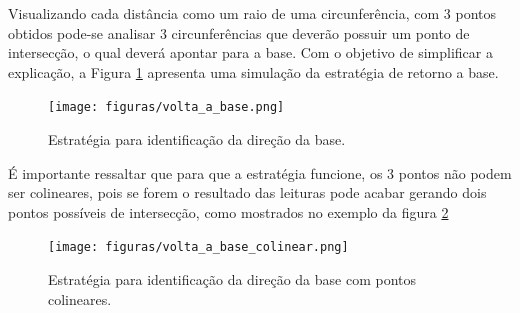 	 	Visualizando cada distância como um raio de uma circunferência, com 3 pontos obtidos pode-se analisar 3 circunferências que deverão possuir um ponto de intersecção, o qual deverá apontar para a base. Com o objetivo de simplificar a explicação, a Figura \ref{img:back} apresenta uma simulação da estratégia de retorno a base.

	 	\begin{figure}[H]
			\centering
			\texttt{[image: figuras/volta\_a\_base.png]}
			\caption{Estratégia para identificação da direção da base.}
			\label{img:back}
		\end{figure} 

		É importante ressaltar que para que a estratégia funcione, os 3 pontos não podem ser colineares, pois se forem o resultado das leituras pode acabar gerando dois pontos possíveis de intersecção, como mostrados no exemplo da figura \ref{img:back2}

		\begin{figure}[H]
			\centering
			\texttt{[image: figuras/volta\_a\_base\_colinear.png]}
			\caption{Estratégia para identificação da direção da base com pontos colineares.}
			\label{img:back2}
		\end{figure} 
